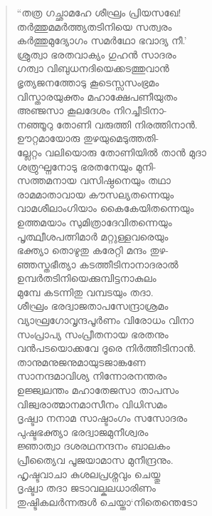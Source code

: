 \begin{verse}
“തത്ര ഗച്ഛാമഹേ ശീഘ്രം പ്രിയസഖേ!\\
തര്‍ത്തുമമര്‍ത്ത്യതടിനിയെ സത്വരം\\
കര്‍ത്തുമുദ്യോഗം സമര്‍ഥോ ഭവാദ്യ നീ.’\\
ശ്രുത്വാ ഭരതവാക്യം ഗുഹന്‍ സാദരം\\
ഗത്വാ വിബുധനദിയെക്കടത്തുവാന്‍\\
ഭൃത്യജനത്തോടു കൂടെസ്സസംഭ്രമം\\
വിസ്താരയുക്തം മഹാക്ഷേപണീയുതം\\
അഞ്ജസാ കൂലദേശം നിറച്ചീടിനാ-\\
നഞ്ഞൂറു തോണി വരുത്തി നിരത്തിനാന്‍.\\
ഊറ്റമായോരു തുഴയുമെടുത്തതി-\\
ല്ലേറ്റം വലിയൊരു തോണിയില്‍ താന്‍ മുദാ\\
ശത്രുഘ്നനോടു ഭരതനേയും മുനി-\\
സത്തമനായ വസിഷ്ഠനെയും തഥാ\\
രാമമാതാവായ കൗസല്യതന്നെയും\\
വാമശീലാംഗിയാം കൈകേയിതന്നെയും\\
ഉത്തമയാം സുമിത്രാദേവിതന്നെയും\\
പൃത്ഥ്വീശപത്നിമാര്‍ മറ്റുള്ളവരെയും\\
ഭക്ത്യാ തൊഴുതു കരേറ്റി മന്ദം തുഴ-\\
ഞ്ഞസ്തഭീത്യാ കടത്തീടിനാനാദരാല്‍\\
ഉമ്പര്‍തടിനിയെക്കുമ്പിട്ടനാകുലം\\
മുമ്പേ കടന്നിതു വമ്പടയും തദാ.\\
ശീഘ്രം ഭരദ്വാജതാപസേന്ദ്രാശ്രമം\\
വ്യാഘ്രഗോവൃന്ദപൂര്‍ണം വിരോധം വിനാ\\
സംപ്രാപ്യ സംപ്രീതനായ ഭരതനും\\
വന്‍പടയൊക്കവേ ദൂരെ നിര്‍ത്തീടിനാന്‍.\\
താനുമനുജനുമായുടജാങ്കണേ\\
സാനന്ദമാവിശ്യ നിന്നോരനന്തരം\\
ഉജ്ജ്വലന്തം മഹാതേജസാ താപസം\\
വിജ്വരാത്മാനമാസീനം വിധിസമം\\
ദൃഷ്ട്വാ നനാമ സാഷ്ടാംഗം സസോദരം\\
പുഷ്ടഭക്ത്യാ ഭരദ്വാജമുനീശ്വരം\\
ജ്ഞാത്വാ ദശരഥനന്ദനം ബാലകം\\
പ്രീത്യൈവ പൂജയാമാസ മുനീന്ദ്രനും.\\
ഹൃഷ്ടവാചാ കുശലപ്രശ്നവും ചെയ്തു\\
ദൃഷ്ട്വാ തദാ ജടാവല്കലധാരിണം\\
തുഷ്ടികലര്‍ന്നരുള്‍ ചെയ്താ‘നിതെന്തെടോ\\

\end{verse}
